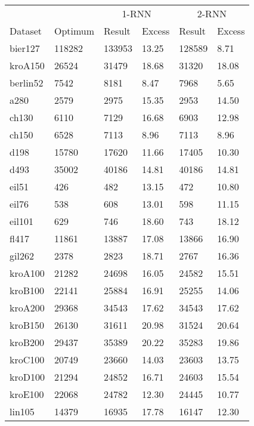 \begin{figure}[ht]
	\centering
	\begin{minipage}{\linewidth}
		\centering
		\small
		\begin{tabular*}{\linewidth}{*{6}{l}}
			\toprule
			&& \multicolumn{2}{c}{1-RNN}& \multicolumn{2}{c}{2-RNN} \\
			\cmidrule(lr){3-4}
			\cmidrule(lr){5-6}
			Dataset & Optimum & Result & Excess & Result & Excess \\
			\midrule
			bier127  & 118282 & 133953 & 13.25 & 128589 & 8.71  \\
			kroA150  & 26524  & 31479  & 18.68 & 31320  & 18.08 \\
			berlin52 & 7542   & 8181   & 8.47  & 7968   & 5.65  \\
			a280     & 2579   & 2975   & 15.35 & 2953   & 14.50 \\
			ch130    & 6110   & 7129   & 16.68 & 6903   & 12.98 \\
			ch150    & 6528   & 7113   & 8.96  & 7113   & 8.96  \\
			d198     & 15780  & 17620  & 11.66 & 17405  & 10.30 \\
			d493     & 35002  & 40186  & 14.81 & 40186  & 14.81 \\
			eil51    & 426    & 482    & 13.15 & 472    & 10.80 \\
			eil76    & 538    & 608    & 13.01 & 598    & 11.15 \\
			eil101   & 629    & 746    & 18.60 & 743    & 18.12 \\
			fl417    & 11861  & 13887  & 17.08 & 13866  & 16.90 \\
			gil262   & 2378   & 2823   & 18.71 & 2767   & 16.36 \\
			kroA100  & 21282  & 24698  & 16.05 & 24582  & 15.51 \\
			kroB100  & 22141  & 25884  & 16.91 & 25255  & 14.06 \\
			kroA200  & 29368  & 34543  & 17.62 & 34543  & 17.62 \\
			kroB150  & 26130  & 31611  & 20.98 & 31524  & 20.64 \\
			kroB200  & 29437  & 35389  & 20.22 & 35283  & 19.86 \\
			kroC100  & 20749  & 23660  & 14.03 & 23603  & 13.75 \\
			kroD100  & 21294  & 24852  & 16.71 & 24603  & 15.54 \\
			kroE100  & 22068  & 24782  & 12.30 & 24445  & 10.77 \\
			lin105   & 14379  & 16935  & 17.78 & 16147  & 12.30 \\

\end{tabular*}
\end{minipage}
\end{figure}
